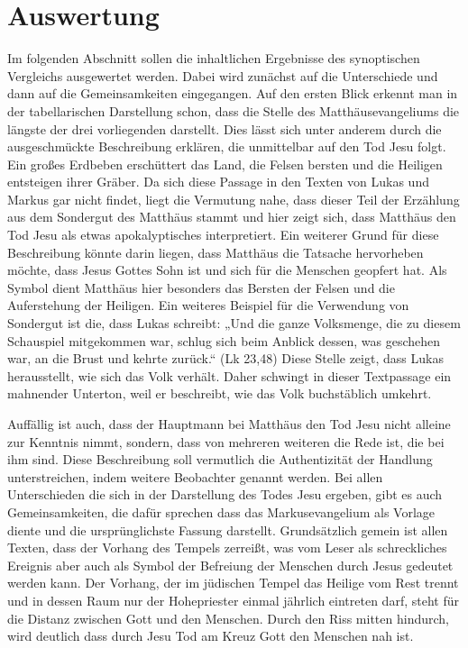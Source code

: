 \section{Auswertung}

Im folgenden Abschnitt sollen die inhaltlichen Ergebnisse des synoptischen Vergleichs ausgewertet werden. Dabei wird zunächst auf die Unterschiede und dann auf die Gemeinsamkeiten eingegangen.
Auf den ersten Blick erkennt man in der tabellarischen Darstellung schon, dass die Stelle des Matthäusevangeliums die längste der drei vorliegenden darstellt. Dies lässt sich unter anderem durch die ausgeschmückte Beschreibung erklären, die  unmittelbar auf den Tod Jesu folgt. Ein großes Erdbeben erschüttert das Land, die Felsen bersten und die Heiligen entsteigen ihrer Gräber. Da sich diese Passage in den Texten von Lukas und Markus gar nicht findet, liegt die Vermutung nahe, dass dieser Teil der Erzählung aus dem Sondergut des Matthäus stammt und hier zeigt sich, dass Matthäus den Tod Jesu als etwas apokalyptisches interpretiert. Ein weiterer Grund für diese Beschreibung könnte darin liegen, dass Matthäus die Tatsache hervorheben möchte, dass Jesus Gottes Sohn ist und sich für die Menschen geopfert hat. Als Symbol dient Matthäus hier besonders das Bersten der Felsen und die Auferstehung der Heiligen. Ein weiteres Beispiel für die Verwendung von Sondergut ist die, dass Lukas schreibt: „Und die ganze Volksmenge, die zu diesem Schauspiel mitgekommen war, schlug sich beim Anblick dessen, was geschehen war, an die Brust und kehrte zurück.“ (Lk 23,48) Diese Stelle zeigt, dass Lukas herausstellt, wie sich das Volk verhält. Daher schwingt in dieser Textpassage ein mahnender Unterton, weil er beschreibt, wie das Volk buchstäblich umkehrt.

Auffällig ist auch, dass der Hauptmann bei Matthäus den Tod Jesu nicht alleine zur Kenntnis nimmt, sondern, dass von mehreren weiteren die Rede ist, die bei ihm sind. Diese Beschreibung soll vermutlich die Authentizität der Handlung unterstreichen, indem weitere Beobachter genannt werden.
Bei allen Unterschieden die sich in der Darstellung des Todes Jesu ergeben, gibt es auch Gemeinsamkeiten, die dafür sprechen dass das Markusevangelium als Vorlage diente und die ursprünglichste Fassung darstellt. Grundsätzlich gemein ist allen Texten, dass der Vorhang des Tempels zerreißt, was vom Leser als schreckliches Ereignis aber auch als Symbol der Befreiung der Menschen durch Jesus gedeutet werden kann. Der Vorhang, der im jüdischen Tempel das Heilige vom Rest trennt und in dessen Raum nur der Hohepriester einmal jährlich eintreten darf, steht für die Distanz zwischen Gott und den Menschen. Durch den Riss mitten hindurch, wird deutlich dass durch Jesu Tod am Kreuz Gott den Menschen nah ist.

